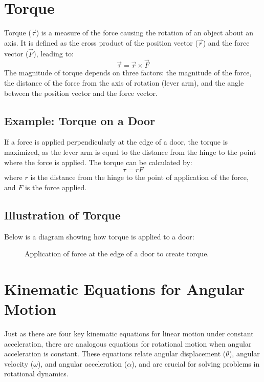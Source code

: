 \documentclass[12pt]{article}
\begin{document}
\section{Torque}

Torque (\(\vec{\tau}\)) is a measure of the force causing the rotation of an object about an axis. It is defined as the cross product of the position vector (\(\vec{r}\)) and the force vector (\(\vec{F}\)), leading to:
\[
\vec{\tau} = \vec{r} \times \vec{F}
\]
The magnitude of torque depends on three factors: the magnitude of the force, the distance of the force from the axis of rotation (lever arm), and the angle between the position vector and the force vector.

\subsection{Example: Torque on a Door}
If a force is applied perpendicularly at the edge of a door, the torque is maximized, as the lever arm is equal to the distance from the hinge to the point where the force is applied. The torque can be calculated by:
\[
\tau = rF
\]
where \(r\) is the distance from the hinge to the point of application of the force, and \(F\) is the force applied.

\subsection{Illustration of Torque}
Below is a diagram showing how torque is applied to a door:

\begin{figure}[h]
\centering
{}
\caption{Application of force at the edge of a door to create torque.}
\end{figure}
\section{Kinematic Equations for Angular Motion}

Just as there are four key kinematic equations for linear motion under constant acceleration, there are analogous equations for rotational motion when angular acceleration is constant. These equations relate angular displacement (\(\theta\)), angular velocity (\(\omega\)), and angular acceleration (\(\alpha\)), and are crucial for solving problems in rotational dynamics.
\end{document}
